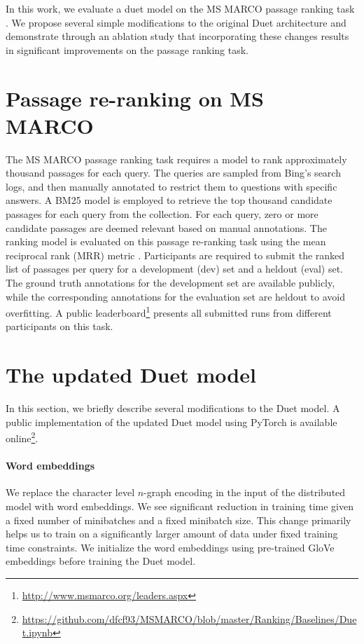 \documentclass{article}
\begin{document}
In this work, we evaluate a duet model on the MS MARCO passage ranking task \citep{bajaj2016ms}.
We propose several simple modifications to the original Duet architecture and demonstrate through an ablation study that incorporating these changes results in significant improvements on the passage ranking task.
 \section{Passage re-ranking on MS MARCO}
\label{sec:task}
The MS MARCO passage ranking task \citep{bajaj2016ms} requires a model to rank approximately thousand passages for each query.
The queries are sampled from Bing's search logs, and then manually annotated to restrict them to questions with specific answers.
A BM25 \citep{robertson2009probabilistic} model is employed to retrieve the top thousand candidate passages for each query from the collection.
For each query, zero or more candidate passages are deemed relevant based on manual annotations.
The ranking model is evaluated on this passage re-ranking task using the mean reciprocal rank (MRR) metric \citep{craswell2009mean}.
Participants are required to submit the ranked list of passages per query for a development (dev) set and a heldout (eval) set.
The ground truth annotations for the development set are available publicly, while the corresponding annotations for the evaluation set are heldout to avoid overfitting.
A public leaderboard\footnote{\url{http://www.msmarco.org/leaders.aspx}} presents all submitted runs from different participants on this task.
 \section{The updated Duet model}
\label{sec:model}
In this section, we briefly describe several modifications to the Duet model.
A public implementation of the updated Duet model using PyTorch \citep{paszke2017automatic} is available online\footnote{\url{https://github.com/dfcf93/MSMARCO/blob/master/Ranking/Baselines/Duet.ipynb}}.

\paragraph{Word embeddings}
We replace the character level $n$-graph encoding in the input of the distributed model with word embeddings.
We see significant reduction in training time given a fixed number of minibatches and a fixed minibatch size.
This change primarily helps us to train on a significantly larger amount of data under fixed training time constraints.
We initialize the word embeddings using pre-trained GloVe \citep{pennington2014glove} embeddings before training the Duet model.
\end{document}
